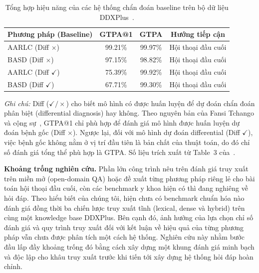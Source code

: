 \begin{table}[H]
    \centering
    \begin{threeparttable}
        \caption{Tổng hợp hiệu năng của các hệ thống chẩn đoán baseline trên bộ dữ liệu DDXPlus~\cite{ddxplus2022}.}
        \label{tab:baseline_ddxplus}
        \small
        \begin{tabular}{lccc}
            \toprule
            \textbf{Phương pháp (Baseline)}              & \textbf{GTPA@1} & \textbf{GTPA} & \textbf{Hướng tiếp cận} \\
            \midrule
            AARLC (Diff $\times$)~\cite{ddxplus2022}     & 99.21\%         & 99.97\%       & Hội thoại đầu cuối      \\
            BASD (Diff $\times$)~\cite{ddxplus2022}      & 97.15\%         & 98.82\%       & Hội thoại đầu cuối      \\
            AARLC (Diff $\checkmark$)~\cite{ddxplus2022} & 75.39\%         & 99.92\%       & Hội thoại đầu cuối      \\
            BASD (Diff $\checkmark$)~\cite{ddxplus2022}  & 67.71\%         & 99.30\%       & Hội thoại đầu cuối      \\
            \bottomrule
        \end{tabular}
        \begin{tablenotes}[flushleft]
            \footnotesize
            \item \textit{Ghi chú:} Diff ($\checkmark/\times$) cho biết mô hình có được huấn luyện để dự đoán chẩn đoán phân biệt (differential diagnosis) hay không. Theo nguyên bản của Fansi Tchango và cộng sự~\cite{ddxplus2022}, GTPA@1 chỉ phù hợp để đánh giá mô hình được huấn luyện dự đoán bệnh gốc (Diff $\times$). Ngược lại, đối với mô hình dự đoán differential (Diff $\checkmark$), việc bệnh gốc không nằm ở vị trí đầu tiên là bản chất của thuật toán, do đó chỉ số đánh giá tổng thể phù hợp là GTPA. Số liệu trích xuất từ Table~3 của~\cite{ddxplus2022}.
        \end{tablenotes}
    \end{threeparttable}
\end{table}

\textbf{Khoảng trống nghiên cứu.} Phần lớn công trình nêu trên đánh giá truy xuất trên miền mở (open-domain QA) hoặc đề xuất từng phương pháp riêng lẻ cho bài toán hội thoại đầu cuối, còn các benchmark y khoa hiện có thì đang nghiêng về hỏi đáp. Theo hiểu biết của chúng tôi, hiện chưa có benchmark chuẩn hóa nào đánh giá đồng thời ba chiến lược truy xuất tĩnh (lexical, dense và hybrid) trên cùng một knowledge base DDXPlus. Bên cạnh đó, ảnh hưởng của lựa chọn chỉ số đánh giá và quy trình truy xuất đối với kết luận về hiệu quả của từng phương pháp vẫn chưa được phân tích một cách hệ thống. Nghiên cứu này nhằm bước đầu lấp đầy khoảng trống đó bằng cách xây dựng một khung đánh giá minh bạch và độc lập cho khâu truy xuất trước khi tiến tới xây dựng hệ thống hỏi đáp hoàn chỉnh.
